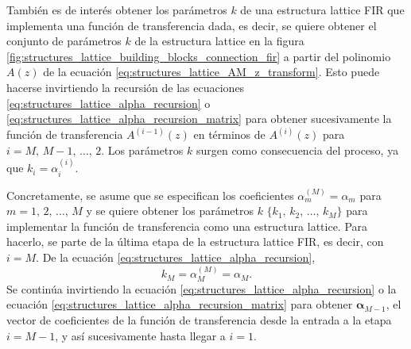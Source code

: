 \documentclass[a4paper]{report}
\newcommand{\alphabf}{\bm{\alpha}}
\begin{document}
También es de interés obtener los parámetros \(k\) de una estructura lattice FIR que implementa una función de transferencia dada, es decir, se quiere obtener el conjunto de parámetros \(k\) de la estructura lattice en la figura \ref{fig:structures_lattice_building_blocks_connection_fir} a partir del polinomio \(A(z)\) de la ecuación \ref{eq:structures_lattice_AM_z_transform}. Esto puede hacerse invirtiendo la recursión de las ecuaciones \ref{eq:structures_lattice_alpha_recursion} o \ref{eq:structures_lattice_alpha_recursion_matrix} para obtener sucesivamente la función de transferencia \(A^{(i-1)}(z)\) en términos de \(A^{(i)}(z)\) para \(i=M,\,M-1,\,\dots,\,2\). Los parámetros \(k\) surgen como consecuencia del proceso, ya que \(k_i=\alpha^{(i)}_i\).

Concretamente, se asume que se especifican los coeficientes \(\alpha^{(M)}_m=\alpha_m\) para \(m=1,\,2,\,\dots,\,M\) y se quiere obtener los parámetros \(k\) \(\{k_1,\,k_2,\,\dots,\,k_M\}\) para implementar la función de transferencia como una estructura lattice. Para hacerlo, se parte de la última etapa de la estructura lattice FIR, es decir, con \(i=M\). De la ecuación \ref{eq:structures_lattice_alpha_recursion},
\[
 k_M=\alpha^{(M)}_M=\alpha_M.
\]
Se continúa invirtiendo la ecuación \ref{eq:structures_lattice_alpha_recursion} o la ecuación \ref{eq:structures_lattice_alpha_recursion_matrix} para obtener \(\alphabf_{M-1}\), el vector de coeficientes de la función de transferencia desde la entrada a la etapa \(i=M-1\), y así sucesivamente hasta llegar a \(i=1\).
\end{document}
